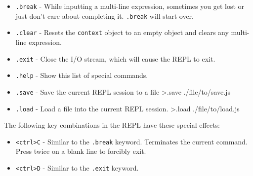 \begin{itemize}
\item
  \texttt{.break} - While inputting a multi-line expression, sometimes
  you get lost or just don't care about completing it. \texttt{.break}
  will start over.
\item
  \texttt{.clear} - Resets the \texttt{context} object to an empty
  object and clears any multi-line expression.
\item
  \texttt{.exit} - Close the I/O stream, which will cause the REPL to
  exit.
\item
  \texttt{.help} - Show this list of special commands.
\item
  \texttt{.save} - Save the current REPL session to a file
  \textgreater{}.save ./file/to/save.js
\item
  \texttt{.load} - Load a file into the current REPL session.
  \textgreater{}.load ./file/to/load.js
\end{itemize}

The following key combinations in the REPL have these special effects:

\begin{itemize}
\item
  \texttt{\textless{}ctrl\textgreater{}C} - Similar to the
  \texttt{.break} keyword. Terminates the current command. Press twice
  on a blank line to forcibly exit.
\item
  \texttt{\textless{}ctrl\textgreater{}D} - Similar to the
  \texttt{.exit} keyword.
\end{itemize}
